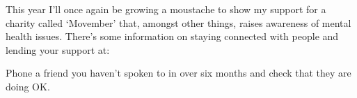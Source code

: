 
This year I'll once again be growing a moustache to show my support
for a charity called `Movember' that, amongst other things,
raises awareness of mental health issues. There's some information
on staying connected with people and lending your support at:

\begin{exercise}
Phone a friend you haven't spoken to in over six months and check that they are doing OK.
\end{exercise}
